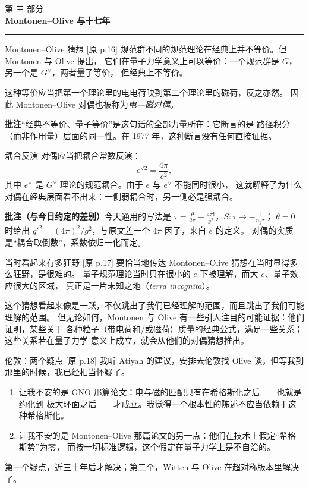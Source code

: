 \documentclass[aspectratio=169,12pt]{ctexbeamer}
\newcommand{\ii}{\mathrm{i}}
\newcommand{\gvee}{G^{\vee}}
\newcommand{\srcp}[1]{{\color{black!40}\scriptsize[原 p.#1]}}
\newcommand{\partframe}[2]{%
\begin{frame}[plain]
  \vspace*{2.6cm}
  {\color{black!35}\large 第 #1 部分}\\[0.8em]
  {\LARGE\bfseries #2}\\[1.2em]
  {\color{black!40}\rule{2.2cm}{0.4pt}}
\end{frame}}
\begin{document}
\partframe{三}{Montonen--Olive 与十七年}

\begin{frame}{Montonen--Olive 猜想}
  \srcp{16} 规范群不同的规范理论在经典上并不等价。但 Montonen 与 Olive 提出，
  它们在量子力学意义上可以等价：一个规范群是 $G$，另一个是 $\gvee$，两者量子等价，
  但经典上不等价。
  \vspace{0.4em}

  这种等价应当把第一个理论里的电电荷映到第二个理论里的磁荷，反之亦然。
  因此 Montonen--Olive 对偶也被称为\emph{电—磁对偶}。
  \begin{beizhu}
  \textbf{批注}\quad “经典不等价、量子等价”是这句话的全部力量所在：它断言的是
  路径积分（而非作用量）层面的同一性。在 1977 年，这种断言没有任何直接证据。
  \end{beizhu}
\end{frame}

\begin{frame}{耦合反演}
  对偶应当把耦合常数反演：
  \[
    e^{\vee2}=\frac{4\pi}{e^2},
  \]
  其中 $e^{\vee}$ 是 $\gvee$ 理论的规范耦合。由于 $e$ 与 $e^{\vee}$ 不能同时很小，
  这就解释了为什么对偶在经典层面看不出来：一侧弱耦合时，另一侧必是强耦合。
  \begin{beizhu}
  \textbf{批注（与今日约定的差别）}\quad 今天通用的写法是
  $\tau=\frac{\theta}{2\pi}+\frac{4\pi\ii}{g^2}$，$S:\tau\mapsto-\frac{1}{n_g\tau}$；
  $\theta=0$ 时给出 $g'^2=(4\pi)^2/g^2$，与原文差一个 $4\pi$ 因子，来自 $e$ 的定义。
  对偶的实质是“耦合取倒数”，系数依归一化而定。
  \end{beizhu}
\end{frame}

\begin{frame}{当时看起来有多狂野}
  \srcp{17} 要恰当地传达 Montonen--Olive 猜想在当时显得多么狂野，是很难的。
  量子规范理论当时只在很小的 $e$ 下被理解，而大 $e$、量子效应很大的区域，
  真正是一片未知之地（\emph{terra incognita}）。
  \vspace{0.5em}

  这个猜想看起来像是一跃，不仅跳出了我们已经理解的范围，而且跳出了我们可能理解的范围。
  但无论如何，Montonen 与 Olive 有一些引人注目的可能证据：他们证明，某些关于
  各种粒子（带电荷和/或磁荷）质量的经典公式，满足一些关系；这些关系若在量子力学
  意义上成立，就会从他们的对偶猜想推出。
\end{frame}

\begin{frame}{伦敦：两个疑点}
  \srcp{18} 我听 Atiyah 的建议，安排去伦敦找 Olive 谈，但等我到那里的时候，我已经相当怀疑了。
  \begin{enumerate}
    \item 让我不安的是 GNO 那篇论文：电与磁的匹配只有在希格斯化之后——也就是约化到
      极大环面之后——才成立。我觉得一个根本性的陈述不应当依赖于这种希格斯化。
    \item 让我不安的是 Montonen--Olive 那篇论文的另一点：他们在技术上假定“希格斯势”为零，
      而按一切标准逻辑，这个假定在量子力学上是不自洽的。
  \end{enumerate}
  \vspace{0.4em}
  第一个疑点，近三十年后才解决；第二个，Witten 与 Olive 在超对称版本里解决了。
\end{frame}
\end{document}
